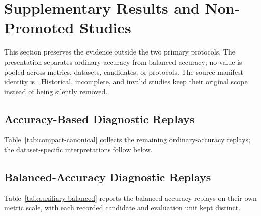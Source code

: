 \section{Supplementary Results and Non-Promoted Studies}
\label{app:auxiliary-results}
\suppressfloats[t]

This section preserves the evidence outside the two primary protocols. The presentation separates
ordinary accuracy from balanced accuracy; no value is pooled across metrics, datasets, candidates,
or protocols. The source-manifest identity is \hashtext{\SourceManifestSHA}. Historical, incomplete,
and invalid studies keep their original scope instead of being silently removed.

\subsection{Accuracy-Based Diagnostic Replays}

Table~\ref{tab:compact-canonical} collects the remaining ordinary-accuracy replays;
the dataset-specific interpretations follow below.

\begin{table}[!htbp]
\centering
\scriptsize
\caption{Supplementary accuracy-regret rows. Lower regret is better. Commitment rate counts
ADAPT or FREEZE and is not interval coverage. These are protocol-specific point summaries:
Office-Home's primary and stream-seed rows are different from its invalidated five-checkpoint
audit; ImageNet-C is configuration-sensitive; PACS has aggregate-only replay. For PACS, $n=12$
counts domain--seed inference units, whereas action frequencies use 216 repeated decisions.}
\label{tab:compact-canonical}

\end{table}

\subsection{Balanced-Accuracy Diagnostic Replays}

Table~\ref{tab:auxiliary-balanced} reports the balanced-accuracy replays on their own
metric scale, with each recorded candidate and evaluation unit kept distinct.

\begin{table}[!htbp]
\centering
\scriptsize
\caption{Supplementary balanced-accuracy-regret rows, kept separate from ordinary accuracy.
The archived runner contracts name balanced accuracy for Camelyon17, ImageNet-R, and RxRx1;
ordinary accuracy can coincide only under the recorded class-balancing conditions.
ImageNet-R aggregates candidate backbones rather than one deployed gate. Camelyon17 OOD was already
opened; its B--v2 rows are separate within-seed diagnostics. RxRx1's displayed row is model seed 0.}
\label{tab:auxiliary-balanced}

\end{table}

